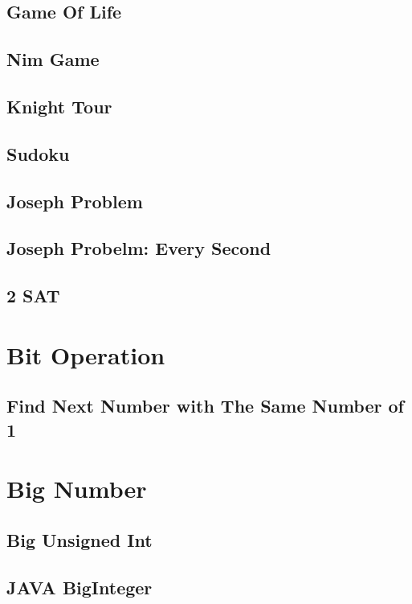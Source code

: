 \documentclass{article}
\begin{document}
    \subsection{Game Of Life}
    \subsection{Nim Game}
        
    \subsection{Knight Tour}
    \subsection{Sudoku}

    \subsection{Joseph Problem}
        
    \subsection{Joseph Probelm: Every Second}
    
    \subsection{2 SAT}
        

\section{Bit Operation}
    \subsection{Find Next Number with The Same Number of 1}

\section{Big Number}
    \subsection{Big Unsigned Int}
        
    \subsection{JAVA BigInteger}
\end{document}
